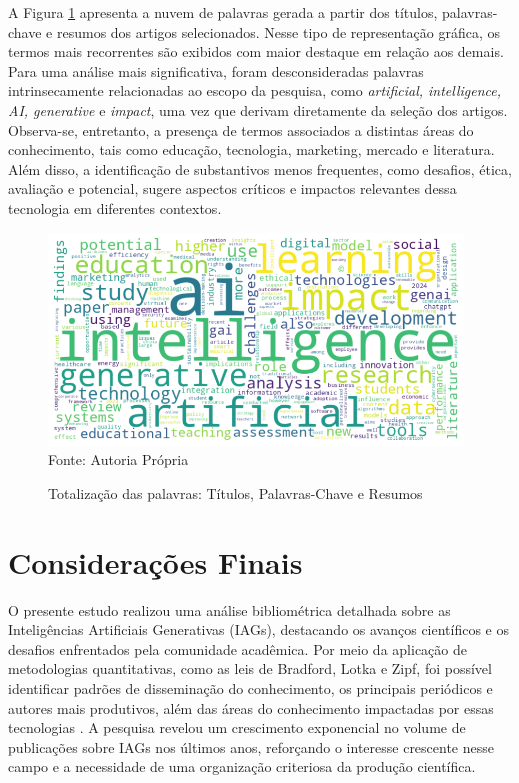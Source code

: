 \documentclass[openany,oneside,a4paper,9pt]{extarticle}
\begin{document}
A Figura \ref{fig:5} apresenta a nuvem de palavras gerada a partir dos títulos, palavras-chave e resumos dos artigos selecionados. Nesse tipo de representação gráfica, os termos mais recorrentes são exibidos com maior destaque em relação aos demais. Para uma análise mais significativa, foram desconsideradas palavras intrinsecamente relacionadas ao escopo da pesquisa, como \textit{artificial, intelligence, AI, generative} e \textit{impact}, uma vez que derivam diretamente da seleção dos artigos. Observa-se, entretanto, a presença de termos associados a distintas áreas do conhecimento, tais como educação, tecnologia, marketing, mercado e literatura. Além disso, a identificação de substantivos menos frequentes, como desafios, ética, avaliação e potencial, sugere aspectos críticos e impactos relevantes dessa tecnologia em diferentes contextos.

\begin{figure}[H]
    \centering
    \caption{Totalização das palavras: Títulos, Palavras-Chave e Resumos}
    \includegraphics[width=11cm]{nuvem_palavras.png}
    \label{fig:5}
    {\\\footnotesize Fonte: Autoria Própria}
\end{figure}


\section{Considerações Finais}
\onehalfspacing
 O presente estudo realizou uma análise bibliométrica detalhada sobre as Inteligências Artificiais Generativas (IAGs), destacando os avanços científicos e os desafios enfrentados pela comunidade acadêmica. Por meio da aplicação de metodologias quantitativas, como as leis de Bradford, Lotka e Zipf, foi possível identificar padrões de disseminação do conhecimento, os principais periódicos e autores mais produtivos, além das áreas do conhecimento impactadas por essas tecnologias \cite{guedes2005bibliometria}. A pesquisa revelou um crescimento exponencial no volume de publicações sobre IAGs nos últimos anos, reforçando o interesse crescente nesse campo e a necessidade de uma organização criteriosa da produção científica.
\end{document}
